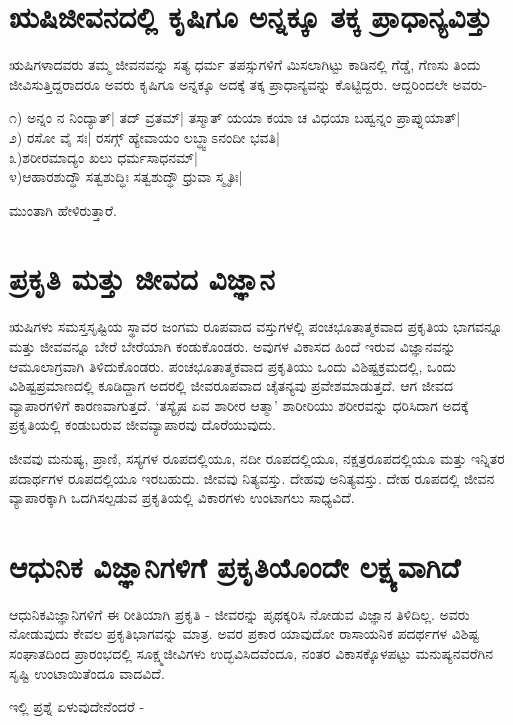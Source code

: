\section*{ಋಷಿಜೀವನದಲ್ಲಿ ಕೃಷಿಗೂ ಅನ್ನಕ್ಕೂ ತಕ್ಕ ಪ್ರಾಧಾನ್ಯವಿತ್ತು}

ಋಷಿಗಳಾದವರು ತಮ್ಮ ಜೀವನವನ್ನು ಸತ್ಯ ಧರ್ಮ ತಪಸ್ಸುಗಳಿಗೆ ಮಿಸಲಾಗಿಟ್ಟು ಕಾಡಿನಲ್ಲಿ ಗೆಡ್ಡೆ, ಗೆಣಸು ತಿಂದು ಜೀವಿಸುತ್ತಿದ್ದರಾದರೂ ಅವರು ಕೃಷಿಗೂ ಅನ್ನಕ್ಕೂ ಅದಕ್ಕೆ ತಕ್ಕ ಪ್ರಾಧಾನ್ಯವನ್ನು ಕೊಟ್ಟಿದ್ದರು. ಆದ್ದರಿಂದಲೇ ಅವರು-

೧) ಅನ್ನಂ ನ ನಿಂದ್ಯಾತ್|\label{76} ತದ್ ವ್ರತಮ್| ತಸ್ಮಾತ್ ಯಯಾ ಕಯಾ ಚ ವಿಧಯಾ ಬಹ್ವನ್ನಂ ಪ್ರಾಪ್ನುಯಾತ್|\\
೨) ರಸೋ ವೈ ಸಃ| ರಸಗ್ಗ್ ಹ್ಯೇವಾಯಂ ಲಬ್ಧ್ವಾಽನಂದೀ ಭವತಿ|\\
೩)ಶರೀರಮಾದ್ಯಂ ಖಲು ಧರ್ಮಸಾಧನಮ್|\\
೪)ಆಹಾರಶುದ್ಧೌ ಸತ್ವಶುದ್ಧಿಃ ಸತ್ವಶುದ್ಧೌ ಧ್ರುವಾ ಸ್ಮೃತಿಃ|

ಮುಂತಾಗಿ ಹೇಳಿರುತ್ತಾರೆ.

\section*{ಪ್ರಕೃತಿ ಮತ್ತು ಜೀವದ ವಿಜ್ಞಾನ}

ಋಷಿಗಳು ಸಮಸ್ತಸೃಷ್ಟಿಯ ಸ್ಥಾವರ ಜಂಗಮ ರೂಪವಾದ ವಸ್ತುಗಳಲ್ಲಿ ಪಂಚಭೂತಾತ್ಮಕವಾದ ಪ್ರಕೃತಿಯ ಭಾಗವನ್ನೂ ಮತ್ತು ಜೀವವನ್ನೂ ಬೇರೆ ಬೇರೆಯಾಗಿ ಕಂಡುಕೊಂಡರು. ಅವುಗಳ ವಿಕಾಸದ ಹಿಂದೆ ಇರುವ ವಿಜ್ಞಾನವನ್ನು ಆಮೂಲಾಗ್ರವಾಗಿ ತಿಳಿದುಕೊಂಡರು. ಪಂಚಭೂತಾತ್ಮಕವಾದ ಪ್ರಕೃತಿಯು ಒಂದು ವಿಶಿಷ್ಟಕ್ರಮದಲ್ಲಿ, ಒಂದು ವಿಶಿಷ್ಟಪ್ರಮಾಣದಲ್ಲಿ ಕೂಡಿದ್ದಾಗ ಅದರಲ್ಲಿ ಜೀವರೂಪವಾದ ಚೈತನ್ಯವು ಪ್ರವೇಶಮಾಡುತ್ತದೆ. ಆಗ ಜೀವದ ವ್ಯಾಪಾರಗಳಿಗೆ ಕಾರಣವಾಗುತ್ತದೆ. `ತಸ್ಯೈಷ ಏವ ಶಾರೀರ ಆತ್ಮಾ' ಶಾರೀರಿಯು ಶರೀರವನ್ನು ಧರಿಸಿದಾಗ ಅದಕ್ಕೆ  ಪ್ರಕೃತಿಯಲ್ಲಿ ಕಂಡುಬರುವ ಜೀವವ್ಯಾಪಾರವು ದೊರೆಯುವುದು.

ಜೀವವು ಮನುಷ್ಯ, ಪ್ರಾಣಿ, ಸಸ್ಯಗಳ ರೂಪದಲ್ಲಿಯೂ, ನದೀ ರೂಪದಲ್ಲಿಯೂ, ನಕ್ಷತ್ರರೂಪದಲ್ಲಿಯೂ ಮತ್ತು ಇನ್ನಿತರ ಪದಾರ್ಥಗಳ ರೂಪದಲ್ಲಿಯೂ ಇರಬಹುದು. ಜೀವವು ನಿತ್ಯವಸ್ತು. ದೇಹವು ಅನಿತ್ಯವಸ್ತು. ದೇಹ ರೂಪದಲ್ಲಿ ಜೀವನ ವ್ಯಾಪಾರಕ್ಕಾಗಿ ಒದಗಿಸಲ್ಪಡುವ ಪ್ರಕೃತಿಯಲ್ಲಿ ವಿಕಾರಗಳು ಉಂಟಾಗಲು ಸಾಧ್ಯವಿದೆ.

\section*{ಆಧುನಿಕ ವಿಜ್ಞಾನಿಗಳಿಗೆ ಪ್ರಕೃತಿಯೊಂದೇ ಲಕ್ಷ್ಯವಾಗಿದೆ}

ಆಧುನಿಕವಿಜ್ಞಾನಿಗಳಿಗೆ ಈ ರೀತಿಯಾಗಿ ಪ್ರಕೃತಿ - ಜೀವರನ್ನು ಪೃಥಕ್ಕರಿಸಿ ನೋಡುವ ವಿಜ್ಞಾನ ತಿಳಿದಿಲ್ಲ. ಅವರು ನೋಡುವುದು ಕೇವಲ ಪ್ರಕೃತಿಭಾಗವನ್ನು ಮಾತ್ರ. ಅವರ ಪ್ರಕಾರ ಯಾವುದೋ ರಾಸಾಯನಿಕ ಪದರ್ಥಗಳ ವಿಶಿಷ್ಟ ಸಂಘಾತದಿಂದ ಪ್ರಾರಂಭದಲ್ಲಿ ಸೂಕ್ಷ್ಮಜೀವಿಗಳು ಉದ್ಭವಿಸಿದವೆಂದೂ, ನಂತರ ವಿಕಾಸಕ್ಕೊಳಪಟ್ಟು ಮನುಷ್ಯನವರೆಗಿನ ಸೃಷ್ಟಿ ಉಂಟಾಯಿತೆಂದೂ ವಾದವಿದೆ.

ಇಲ್ಲಿ ಪ್ರಶ್ನೆ ಏಳುವುದೇನೆಂದರೆ -

